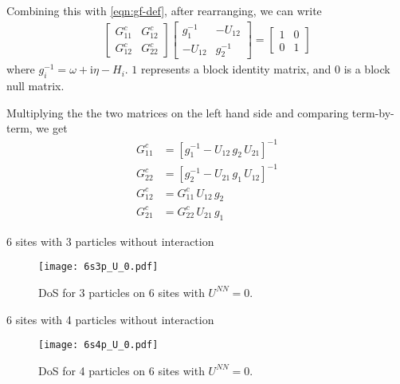 \documentclass[usenames,dvipsnames]{beamer}
\newcommand{\I}{\mathrm{i}}
\begin{document}
\begin{frame}
		Combining this with \eqref{eqn:gf-def}, after rearranging, we can write
		\begin{align}
		\begin{bmatrix}
		{G}^{c}_{11} 	& 	{G}^{c}_{12} \\
		{G}^{c}_{12} 	& 	{G}^{c}_{22}
		\end{bmatrix}
		\begin{bmatrix}
		g^{-1}_{1} 	& 	-U_{12} \\
		-U_{12} 	& 	g^{-1}_{2}
		\end{bmatrix} = 
		\begin{bmatrix}
		1 & 0\\
		0 & 1
		\end{bmatrix}
		\end{align}
		where $ g^{-1}_{i} = \omega +\I \eta - H_i $. $ 1 $ represents a block identity matrix, and $ 0 $ is a block null matrix.
		
		Multiplying the the two matrices on the left hand side and comparing term-by-term, we get
		\begin{align}
		\label{eqn:fg11}
		G^{c}_{11} &= \left[ g^{-1}_{1} - U_{12}\,g_2\,U_{21}  \right]^{-1}\\
		\label{eqn:fg22}
		G^{c}_{22} &= \left[ g^{-1}_{2} - U_{21}\,g_1\,U_{12}  \right]^{-1}\\
		\label{eqn:fg12}
		G^{c}_{12} &= G^{c}_{11}\,U_{12}\,g_2\\
		\label{eqn:fg21}
		G^{c}_{21} &= G^{c}_{22}\,U_{21}\,g_1
		\end{align}
\end{frame}
\begin{frame}{6 sites with 3 particles without interaction}
	\begin{figure}
		\centering
		\texttt{[image: 6s3p\_U\_0.pdf]}
		\caption{DoS for 3 particles on 6 sites with $ U^{NN} = 0 $.}
	\end{figure}
\end{frame}
\begin{frame}{6 sites with 4 particles without interaction}
	\begin{figure}
		\centering
		\texttt{[image: 6s4p\_U\_0.pdf]}
		\caption{DoS for 4 particles on 6 sites with $ U^{NN} = 0 $.}
	\end{figure}
\end{frame}
\end{document}

